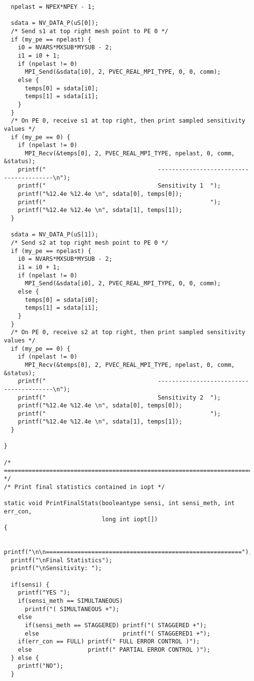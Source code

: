 \begin{verbatim}
  npelast = NPEX*NPEY - 1;

  sdata = NV_DATA_P(uS[0]);
  /* Send s1 at top right mesh point to PE 0 */
  if (my_pe == npelast) {
    i0 = NVARS*MXSUB*MYSUB - 2;
    i1 = i0 + 1;
    if (npelast != 0)
      MPI_Send(&sdata[i0], 2, PVEC_REAL_MPI_TYPE, 0, 0, comm);
    else {
      temps[0] = sdata[i0];
      temps[1] = sdata[i1];
    }
  }
  /* On PE 0, receive s1 at top right, then print sampled sensitivity values */ 
  if (my_pe == 0) {
    if (npelast != 0)
      MPI_Recv(&temps[0], 2, PVEC_REAL_MPI_TYPE, npelast, 0, comm, &status);
    printf("                                ----------------------------------------\n");
    printf("                                Sensitivity 1  ");
    printf("%12.4e %12.4e \n", sdata[0], temps[0]); 
    printf("                                               ");
    printf("%12.4e %12.4e \n", sdata[1], temps[1]);
  }

  sdata = NV_DATA_P(uS[1]);
  /* Send s2 at top right mesh point to PE 0 */
  if (my_pe == npelast) {
    i0 = NVARS*MXSUB*MYSUB - 2;
    i1 = i0 + 1;
    if (npelast != 0)
      MPI_Send(&sdata[i0], 2, PVEC_REAL_MPI_TYPE, 0, 0, comm);
    else {
      temps[0] = sdata[i0];
      temps[1] = sdata[i1];
    }
  }
  /* On PE 0, receive s2 at top right, then print sampled sensitivity values */ 
  if (my_pe == 0) {
    if (npelast != 0)
      MPI_Recv(&temps[0], 2, PVEC_REAL_MPI_TYPE, npelast, 0, comm, &status);
    printf("                                ----------------------------------------\n");
    printf("                                Sensitivity 2  ");
    printf("%12.4e %12.4e \n", sdata[0], temps[0]); 
    printf("                                               ");
    printf("%12.4e %12.4e \n", sdata[1], temps[1]);
  }

}

/* ======================================================================= */
/* Print final statistics contained in iopt */

static void PrintFinalStats(booleantype sensi, int sensi_meth, int err_con, 
                            long int iopt[])
{

  printf("\n\n========================================================");
  printf("\nFinal Statistics");
  printf("\nSensitivity: ");

  if(sensi) {
    printf("YES ");
    if(sensi_meth == SIMULTANEOUS)   
      printf("( SIMULTANEOUS +");
    else 
      if(sensi_meth == STAGGERED) printf("( STAGGERED +");
      else                        printf("( STAGGERED1 +");                      
    if(err_con == FULL) printf(" FULL ERROR CONTROL )");
    else                printf(" PARTIAL ERROR CONTROL )");
  } else {
    printf("NO");
  }


\end{verbatim}
